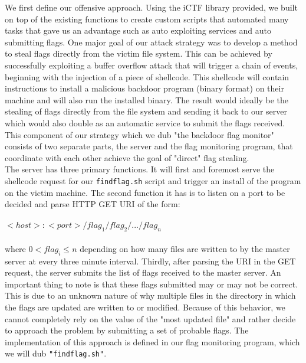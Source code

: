 \documentclass[12pt]{report}
\begin{document}
We first define our offensive approach. Using the iCTF library provided, we built on top of the existing functions to create custom scripts that automated many tasks that gave us an advantage such as auto exploiting services and auto submitting flags. One major goal of our attack strategy was to develop a method to steal flags directly from the victim file system. This can be achieved by successfully exploiting a buffer overflow attack that will trigger a chain of events, beginning with the injection of a piece of shellcode. This shellcode will contain instructions to install a malicious backdoor program (binary format) on their machine and will also run the installed binary. The result would ideally be the stealing of flags directly from the file system and sending it back to our server which would also double as an automatic service to submit the flags received. This component of our strategy which we dub "the backdoor flag monitor" consists of two separate parts, the server and the flag monitoring program, that coordinate with each other achieve the goal of "direct" flag stealing. \\

The server has three primary functions. It will first and foremost serve the shellcode request for our \texttt{findflag.sh} script and trigger an install of the program on the victim machine. The second function it has is to listen on a port to be decided and parse HTTP GET URI of the form:\\\\
$<host>:<port>/flag_{1}/flag_{2}/.../flag_{n}$\\\\ where $0 < flag_i \leq n$ depending on how many files are written to by the master server at every three minute interval. Thirdly, after parsing the URI in the GET request, the server submits the list of flags received to the master server. An important thing to note is that these flags submitted may or may not be correct. This is due to an unknown nature of why multiple files in the directory in which the flags are updated are written to or modified. Because of this behavior, we cannot completely rely on the value of the "most updated file" and rather decide to approach the problem by submitting a set of probable flags. The implementation of this approach is defined in our flag monitoring program, which we will dub \texttt{"findflag.sh"}.\\
\end{document}
